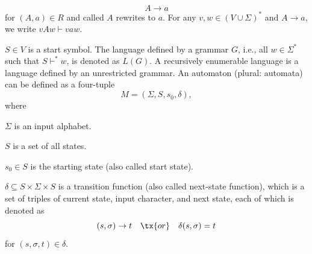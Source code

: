 \documentclass[a4paper,12pt]{article}
\begin{document}
\[A\to a\]
for $(A,a)\in R$ and called $A$ rewrites to $a$. For any $v,w\in(V\cup\Sigma)^*$ and $A\to a$, we write $vAw\vdash vaw$.
\item $S\in V$ is a start symbol.
\eit
The language defined by a grammar $G$, i.e., all $w\in\Sigma^*$ such that $S\vdash^*w$, is denoted as $L(G)$.
A recursively enumerable language is a language defined by an unrestricted grammar.
An automaton (plural: automata) can be defined as a four-tuple
\[M=(\Sigma,S,s_0,\delta),\]
where
\bit
\item $\Sigma$ is an input alphabet.
\item $S$ is a set of all states.
\item $s_0\in S$ is the starting state (also called start state).
\item $\delta\subseteq S\times\Sigma\times S$ is a transition function (also called next-state function), which is a set of triples of current state, input character, and next state, each of which is denoted as
\[(s,\sigma)\to t\quad\tx{or}\quad\delta(s,\sigma)=t\]
for $(s,\sigma,t)\in\delta$.
\end{document}
